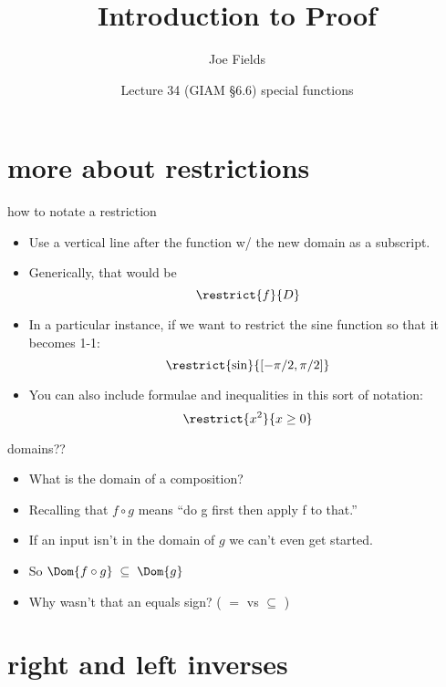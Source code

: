 \documentclass[handout,landscape]{beamer}
\author{Joe Fields}
\title{Introduction to Proof}
\date{Lecture 34 (GIAM \S 6.6) \newline special functions}
\institute[SCSU]{ {\tt fieldsj1@southernct.edu} }
\begin{document}
\begin{frame}[plain]
  \titlepage
\end{frame}

\section{more about restrictions}

\begin{frame}{how to notate a restriction}
\begin{itemize}
  \item Use a vertical line after the function w/ the new domain as a subscript. \pause
  \item Generically, that would be
  \[ \restrict{f}{D} \] \pause
  \item In a particular instance, if we want to restrict the sine function so that it becomes 1-1: \pause
  \[ \restrict{\sin}{[-\pi/2, \pi/2]} \] \pause
  \item You can also include formulae and inequalities in this sort of notation: \pause
  \[ \restrict{x^2}{x \geq 0} \] \pause
\end{itemize}
\end{frame}


\begin{frame}{domains??}
\begin{itemize}
  \item What is the domain of a composition? \pause
  \item Recalling that $f \circ g$ means ``do g first then apply f to that.'' \pause
  \item If an input isn't in the domain of $g$ we can't even get started. \pause
  \item So $\Dom{f \circ g} \; \subseteq \; \Dom{g}$ \pause
  \item Why wasn't that an equals sign?  ( $=$ vs $\subseteq$ )
\end{itemize}
\end{frame}



\section{right and left inverses}
\end{document}
